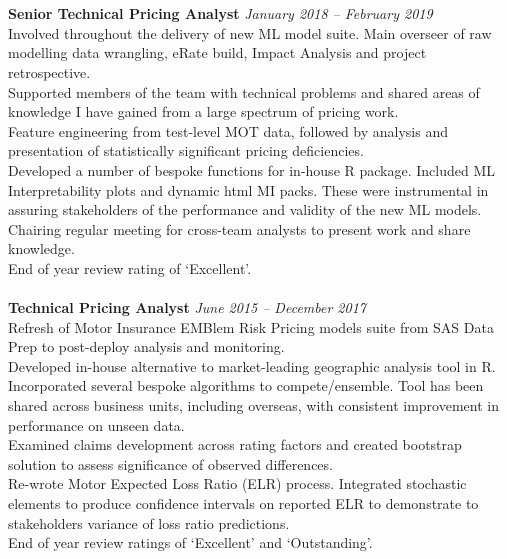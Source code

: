 \documentclass[11pt]{article}
\begin{document}
\begin{description}
\\\\
\textbf{Senior Technical Pricing Analyst} \emph{January 2018 -- February 2019}\\
\textbullet \quad Involved throughout the delivery of new ML model suite. Main overseer of raw modelling data wrangling, eRate build, Impact Analysis and project retrospective. \\
\textbullet \quad Supported members of the team with technical problems and shared areas of knowledge I have gained from a large spectrum of pricing work. \\
\textbullet \quad Feature engineering from test-level MOT data, followed by analysis and presentation of statistically significant pricing deficiencies. \\
\textbullet \quad Developed a number of bespoke functions for in-house R package. Included ML Interpretability plots and dynamic html MI packs. These were instrumental in assuring stakeholders of the performance and validity of the new ML models. \\
\textbullet \quad Chairing regular meeting for cross-team analysts to present work and share knowledge. \\
\textbullet \quad End of year review rating of `Excellent'.
\\\\
\textbf{Technical Pricing Analyst} \emph{June 2015 -- December 2017}\\
\textbullet \quad Refresh of Motor Insurance EMBlem Risk Pricing models suite from SAS Data Prep to post-deploy analysis and monitoring. \\
\textbullet \quad Developed in-house alternative to market-leading geographic analysis tool in R. Incorporated several bespoke algorithms to compete/ensemble. Tool has been shared across business units, including overseas, with consistent improvement in performance on unseen data. \\
\textbullet \quad Examined claims development across rating factors and created bootstrap solution to assess significance of observed differences. \\
\textbullet \quad Re-wrote Motor Expected Loss Ratio (ELR) process. Integrated stochastic elements to produce confidence intervals on reported ELR to demonstrate to stakeholders variance of loss ratio predictions.\\
\textbullet \quad End of year review ratings of `Excellent' and `Outstanding'.
\\\\

\end{description}
\end{document}
